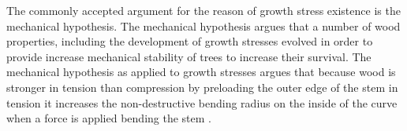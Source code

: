 The commonly accepted argument for the reason of growth stress existence is
the mechanical hypothesis. The mechanical hypothesis argues that a number of wood
properties, including the development of growth stresses evolved in order to
provide increase mechanical stability of trees to increase their
survival. The mechanical hypothesis as applied to growth stresses argues that
because wood is stronger in tension than compression by preloading the outer
edge of the stem in tension it increases the non-destructive bending radius on
the inside of the curve when a force is applied bending the stem \cite{barnett2003wood}.
